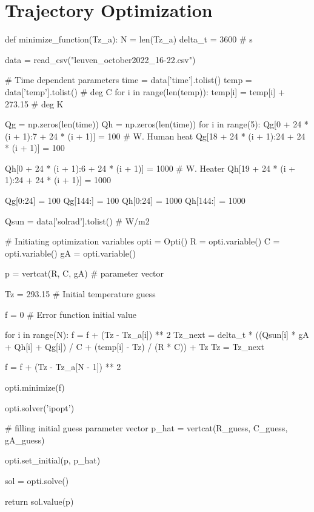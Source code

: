 \section{Trajectory Optimization}
\label{sec:trajectory_optimization}

\begin{python}
def minimize_function(Tz_a):
    N = len(Tz_a)
    delta_t = 3600  # s

    data = read_csv("leuven_october2022_16-22.csv")

    # Time dependent parameters
    time = data['time'].tolist()
    temp = data['temp'].tolist()  # deg C
    for i in range(len(temp)):
        temp[i] = temp[i] + 273.15  # deg K

    Qg = np.zeros(len(time))
    Qh = np.zeros(len(time))
    for i in range(5):
        Qg[0 + 24 * (i + 1):7 + 24 * (i + 1)] = 100  # W. Human heat 
        Qg[18 + 24 * (i + 1):24 + 24 * (i + 1)] = 100 

        Qh[0 + 24 * (i + 1):6 + 24 * (i + 1)] = 1000  # W. Heater
        Qh[19 + 24 * (i + 1):24 + 24 * (i + 1)] = 1000

    Qg[0:24] = 100
    Qg[144:] = 100
    Qh[0:24] = 1000
    Qh[144:] = 1000

    Qsun = data['solrad'].tolist()  # W/m2

    # Initiating optimization variables
    opti = Opti()
    R = opti.variable()
    C = opti.variable()
    gA = opti.variable()

    p = vertcat(R, C, gA)  # parameter vector

    Tz = 293.15  # Initial temperature guess

    f = 0   # Error function initial value

    for i in range(N):
        f = f + (Tz - Tz_a[i]) ** 2
        Tz_next = delta_t * ((Qsun[i] * gA + Qh[i] + Qg[i]) / C + (temp[i] - Tz) / (R * C)) + Tz
        Tz = Tz_next
        
    f = f + (Tz - Tz_a[N - 1]) ** 2

    opti.minimize(f)

    opti.solver('ipopt')

    # filling initial guess parameter vector
    p_hat = vertcat(R_guess, C_guess, gA_guess)

    opti.set_initial(p, p_hat)

    sol = opti.solve()

    return sol.value(p)
\end{python}

